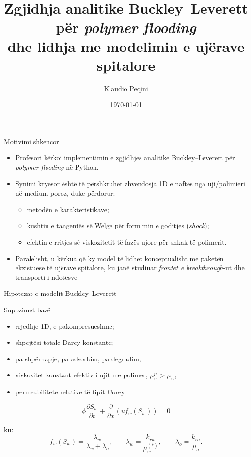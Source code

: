 \documentclass[aspectratio=169]{beamer}
\title{Zgjidhja analitike Buckley--Leverett për \textit{polymer flooding}\\dhe lidhja me modelimin e ujërave spitalore}
\author{Klaudio Peqini}
\institute{Material për diskutim me profesorin}
\date{\today}
\begin{document}
\begin{frame}
  \titlepage
\end{frame}

\begin{frame}{Motivimi shkencor}
\begin{itemize}
  \item Profesori kërkoi implementimin e zgjidhjes analitike Buckley--Leverett për \textit{polymer flooding} në Python.
  \item Synimi kryesor është të përshkruhet zhvendosja 1D e naftës nga uji/polimieri në medium poroz, duke përdorur:
  \begin{itemize}
    \item metodën e karakteristikave;
    \item kushtin e tangentës së Welge për formimin e goditjes (\textit{shock});
    \item efektin e rritjes së viskozitetit të fazës ujore për shkak të polimerit.
  \end{itemize}
  \item Paralelisht, u kërkua që ky model të lidhet konceptualisht me paketën ekzistuese të ujërave spitalore, ku janë studiuar \textit{frontet e breakthrough}-ut dhe transporti i ndotësve.
\end{itemize}
\end{frame}

\begin{frame}{Hipotezat e modelit Buckley--Leverett}
\begin{block}{Supozimet bazë}
\begin{itemize}
  \item rrjedhje 1D, e pakompresueshme;
  \item shpejtësi totale Darcy konstante;
  \item pa shpërhapje, pa adsorbim, pa degradim;
  \item viskozitet konstant efektiv i ujit me polimer, $\mu_w^p > \mu_w$;
  \item permeabilitete relative të tipit Corey.
\end{itemize}
\end{block}

\begin{equation*}
\phi \frac{\partial S_w}{\partial t} + \frac{\partial}{\partial x}\left(u f_w(S_w)\right)=0
\end{equation*}

ku:
\[
f_w(S_w)=\frac{\lambda_w}{\lambda_w+\lambda_o}, \qquad
\lambda_w=\frac{k_{rw}}{\mu_w^{(*)}}, \qquad
\lambda_o=\frac{k_{ro}}{\mu_o}.
\]
\end{frame}
\end{document}
